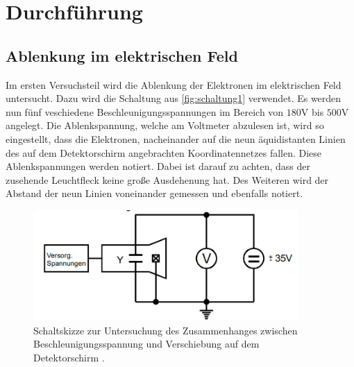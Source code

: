 \section{Durchführung}
\label{sec:Durchführung}
\subsection{Ablenkung im elektrischen Feld}
    Im ersten Versuchsteil wird die Ablenkung der Elektronen im elektrischen Feld untersucht. Dazu wird die Schaltung aus 
    \autoref{fig:schaltung1} verwendet. Es werden nun fünf veschiedene Beschleunigungsspannungen im Bereich von $180$V bis $500$V
    angelegt. Die Ablenkspannung, welche am 
    Voltmeter abzulesen ist, wird so eingestellt, dass die Elektronen, nacheinander auf die neun äquidistanten Linien des auf dem 
    Detektorschirm angebrachten Koordinatennetzes fallen. Diese Ablenkspannungen werden notiert. Dabei ist darauf zu achten, dass der 
    zusehende Leuchtfleck keine große Ausdehenung hat. Des Weiteren wird der Abstand der neun Linien voneinander gemessen und ebenfalls notiert.
    \begin{figure}
        \centering
        \includegraphics[width=0.9\textwidth]{content/schaltung_ablenk.png}
        \caption{Schaltskizze zur Untersuchung des Zusammenhanges zwischen Beschleunigungsspannung und Verschiebung auf dem Detektorschirm \cite{V501-und-V502}.}
        \label{fig:schaltung1}
    \end{figure}


